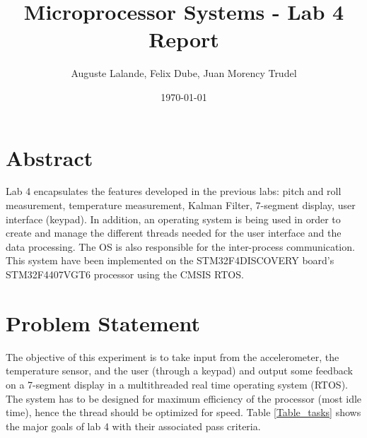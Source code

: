 \documentclass[12pt]{article}
\title{Microprocessor Systems - Lab 4 Report}
\author{Auguste Lalande, Felix Dube, Juan Morency Trudel}
\date{\today}
\begin{document}
\maketitle
\clearpage

\tableofcontents
\clearpage

\section{Abstract}
Lab 4 encapsulates the features developed in the previous labs: pitch and roll measurement, temperature measurement, Kalman Filter, 7-segment display, user interface (keypad). In addition, an operating system is being used in order to create and manage the different threads needed for the user interface and the data processing. The OS is also responsible for the inter-process communication. This system have been implemented on the STM32F4DISCOVERY board’s STM32F4407VGT6 processor using the CMSIS RTOS.

\section{Problem Statement}
The objective of this experiment is to take input from the accelerometer, the temperature sensor, and the user (through a keypad) and output some feedback on a 7-segment display in a multithreaded real time operating system (RTOS). The system has to be designed for maximum efficiency of the processor (most idle time), hence the thread should be optimized for speed. Table \ref{Table_tasks} shows the major goals of lab 4 with their associated pass criteria.
\end{document}
